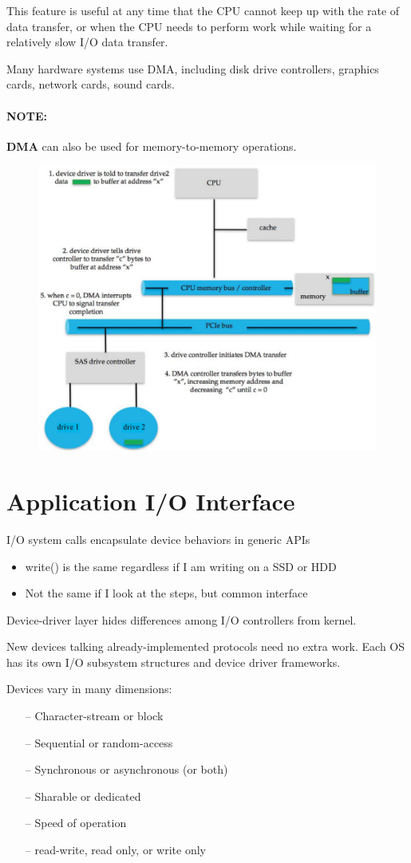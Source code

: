 This feature is useful at any time that the CPU cannot keep up with the
rate of data transfer, or when the CPU needs to perform work while
waiting for a relatively slow I/O data transfer.

Many hardware systems use DMA, including disk drive controllers,
graphics cards, network cards, sound cards.

\paragraph{NOTE:} \textbf{DMA} can also be used for memory-to-memory operations.

\begin{figure}[h!]
    \centering
    \includegraphics[width=0.5\linewidth]{img/hmmngfhb.png}
\end{figure}


\section{Application I/O Interface}
I/O system calls encapsulate device behaviors in generic APIs

\begin{itemize}
    \item write() is the same regardless if I am writing on a SSD or HDD
    \item Not the same if I look at the steps, but common interface
\end{itemize}

Device-driver layer hides differences among I/O controllers from kernel.

New devices talking already-implemented protocols need no extra
work. Each OS has its own I/O subsystem structures and device driver
frameworks.

Devices vary in many dimensions:

\begin{itemize}
    \item[--] Character-stream or block
    \item[--] Sequential or random-access
    \item[--] Synchronous or asynchronous (or both)
    \item[--] Sharable or dedicated
    \item[--] Speed of operation
    \item[--] read-write, read only, or write only
\end{itemize}

